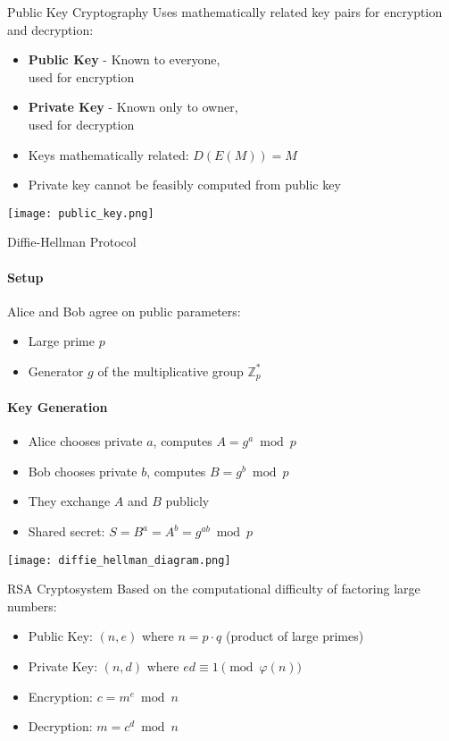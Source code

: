 
\begin{definition}{Public Key Cryptography}
    Uses mathematically related key pairs for encryption and decryption:
    \begin{itemize}
        \item \textbf{Public Key} - Known to everyone, \\used for encryption
        \item \textbf{Private Key} - Known only to owner, \\used for decryption
        \item Keys mathematically related: $D(E(M)) = M$
        \item Private key cannot be feasibly computed from public key
    \end{itemize}
    \texttt{[image: public\_key.png]}
\end{definition}

\begin{KR}{Diffie-Hellman Protocol}
    \paragraph{Setup}
    Alice and Bob agree on public parameters:
    \begin{itemize}
        \item Large prime $p$
        \item Generator $g$ of the multiplicative group $\mathbb{Z}_p^*$
    \end{itemize}
    
    \paragraph{Key Generation}
    \begin{itemize}
        \item Alice chooses private $a$, computes $A = g^a \bmod p$
        \item Bob chooses private $b$, computes $B = g^b \bmod p$
        \item They exchange $A$ and $B$ publicly
        \item Shared secret: $S = B^a = A^b = g^{ab} \bmod p$
    \end{itemize}
    \texttt{[image: diffie\_hellman\_diagram.png]}
\end{KR}

\begin{definition}{RSA Cryptosystem}
    Based on the computational difficulty of factoring large numbers:
    \begin{itemize}
        \item Public Key: $(n, e)$ where $n = p \cdot q$ (product of large primes)
        \item Private Key: $(n, d)$ where $ed \equiv 1 \pmod{\varphi(n)}$
        \item Encryption: $c = m^e \bmod n$
        \item Decryption: $m = c^d \bmod n$
    \end{itemize}
\end{definition}

